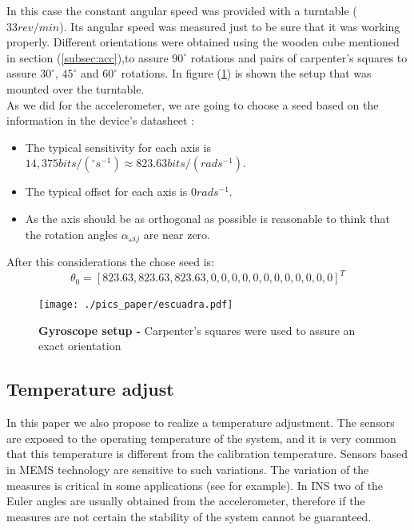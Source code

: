 \documentclass[conference]{IEEEtran}
\newcommand{\refp}[1]{(\ref{#1})}
\begin{document}
In this case the constant angular speed was provided with a turntable ($33 rev/min$). Its angular speed was measured just to be sure that it was working properly. Different orientations were obtained using the wooden cube mentioned in section \refp{subsec:acc},to assure $90^\circ$ rotations and pairs of carpenter's squares to assure $30^\circ$, $45^\circ$ and $60^\circ$ rotations. In figure \refp{fig:setup_gyro} is shown the setup that was mounted over the turntable.\\

As we did for the accelerometer, we are going to choose a seed based on the information in the device's datasheet \cite{bib:gyro_data}: 

\begin{itemize}
\item The typical sensitivity for each axis is $14,375 bits/(^\circ s^{-1})\approx 823.63 bits/(rad s^{-1})$.
\item The typical offset for each axis is $0 rad s^{-1}$.
\item As the axis should be as orthogonal as possible is reasonable to think that the rotation angles $\alpha_{\omega ij}$ are near zero. 
\end{itemize}

After this considerations the chose seed is:
\begin{equation}
{\theta}_0 = [823.63, 823.63, 823.63, 0, 0, 0, 0, 0, 0, 0, 0, 0, 0, 0, 0]^T
\end{equation}

\begin{figure}
	\centering
	\texttt{[image: ./pics\_paper/escuadra.pdf]}
	\caption{\textbf{Gyroscope setup - }Carpenter's squares were used to assure an exact orientation}
	\label{fig:setup_gyro}
\end{figure}


\subsection{Temperature adjust}
\label{sec:param_temp}

In this paper we also propose to realize a temperature adjustment. The sensors are exposed to the operating temperature of the system, and it is very common that this temperature is different from the calibration temperature. Sensors based in MEMS technology are sensitive to such variations. The variation of the measures is critical in some applications (see \cite{bib:uquad} for example). In INS two of the Euler angles are usually obtained from the accelerometer, therefore if the measures are not certain the stability of the system cannot be guaranteed.\\
\end{document}
